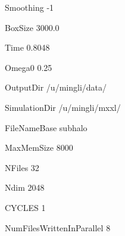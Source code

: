 Smoothing -1

BoxSize 3000.0

Time    0.8048

Omega0  0.25

OutputDir /u/mingli/data/

SimulationDir /u/mingli/mxxl/

FileNameBase subhalo

MaxMemSize 8000

NFiles 32

Ndim   2048

CYCLES 1

NumFilesWrittenInParallel 8

